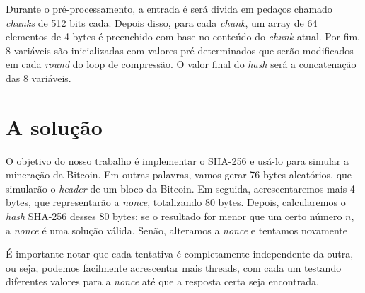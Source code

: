\documentclass[12pt]{article}
\begin{document}
Durante o pré-processamento,
a entrada é será divida em pedaços chamado \textit{chunks}
de 512 bits cada.
Depois disso, para cada \textit{chunk},
um array de 64 elementos de 4 bytes é
preenchido com base no conteúdo do \textit{chunk} atual.
Por fim, 8 variáveis são inicializadas com valores pré-determinados
que serão modificados em cada \textit{round} do loop de compressão.
O valor final do \textit{hash} será a concatenação das 8 variáveis.

\section{A solução}
O objetivo do nosso trabalho é
implementar o SHA-256 e
usá-lo para simular a mineração da Bitcoin.
Em outras palavras,
vamos gerar 76 bytes aleatórios,
que simularão o \textit{header} de um bloco da Bitcoin.
Em seguida, acrescentaremos mais 4 bytes,
que representarão a \textit{nonce},
totalizando 80 bytes.
Depois, calcularemos o \textit{hash} SHA-256 desses 80 bytes:
se o resultado for menor que um certo número $n$,
a \textit{nonce} é uma solução válida.
Senão, alteramos a \textit{nonce} e tentamos novamente

É importante notar que cada tentativa
é completamente independente da outra, ou seja,
podemos facilmente acrescentar mais threads,
com cada um testando diferentes valores para a \textit{nonce}
até que a resposta certa seja encontrada.
\end{document}
